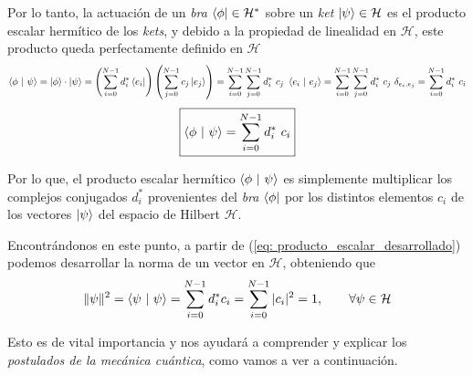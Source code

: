 \documentclass[12pt]{article}
\numberwithin{equation}{section} %
\begin{document}
    \vspace{1.5mm}

    Por lo tanto, la actuación de un \textit{bra} \( \bra{\phi} \in \mathcal{H}^{*} \) sobre un \textit{ket} \( \ket{\psi} \in \mathcal{H} \) es el producto escalar hermítico de los \textit{kets}, y debido a la propiedad de linealidad en \( \mathcal{H} \), este producto queda perfectamente definido en \( \mathcal{H} \)
    \begin{equation*}
        \braket{\phi \ | \ \psi} = \ket{\phi} \cdot \ket{\psi} = \left( \sum_{i = 0}^{N - 1} d_{i}^{*} \bra{e_{i}} \right) \left( \sum_{j = 0}^{N - 1} c_{j} \ket{e_{j}} \right) = \sum_{i = 0}^{N - 1} \sum_{j = 0}^{N - 1} d_{i}^{*} \ c_{j} \ \braket{e_{i} \ | \ e_{j}} = \sum_{i = 0}^{N - 1} \sum_{j = 0}^{N - 1} d_{i}^{*} \ c_{j} \ \delta_{e_{i}, e_{j}} = \sum_{i = 0}^{N - 1} d_{i}^{*} \ c_{i}
    \end{equation*}
    \begin{equation}
        \boxed{\braket{\phi \ | \ \psi} = \sum_{i = 0}^{N - 1} d_{i}^{*} \ c_{i}}
        \label{eq: producto_escalar_desarrollado}
    \end{equation}

    \vspace{1.5mm}

    Por lo que, el producto escalar hermítico \( \braket{\phi \ | \ \psi} \) es simplemente multiplicar los complejos conjugados \( d_{i}^{*} \) provenientes del \textit{bra} \( \bra{\phi} \) por los distintos elementos \( c_{i} \) de los vectores \( \ket{\psi} \) del espacio de Hilbert \( \mathcal{H} \). 

    \vspace{5mm}

    Encontrándonos en este punto, a partir de (\ref{eq: producto_escalar_desarrollado}) podemos desarrollar la norma de un vector en \( \mathcal{H} \), obteniendo que
    \begin{equation}
        \| \psi \| ^{2} = \braket{\psi \ | \ \psi} = \sum_{i = 0}^{N - 1} d_{i}^{*} c_{i} = \sum_{i = 0}^{N - 1} | c_{i} | ^{2} = 1, \qquad \forall \psi \in \mathcal{H}
        \label{eq: norma_vector_hilbert}
    \end{equation}

    \vspace{2.5mm}

    Esto es de vital importancia y nos ayudará a comprender y explicar los \textit{postulados de la mecánica cuántica}, como vamos a ver a continuación.
\end{document}
